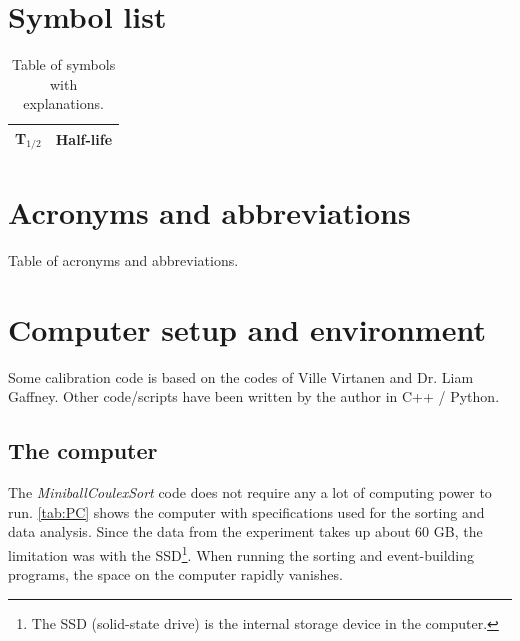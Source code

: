 \documentclass[twoside,english]{uiofysmaster/uiofysmaster}
\begin{document}

\begin{appendices}

\chapter{Symbol list}

\begin{table}[h]
  \centering
  \caption{Table of symbols with explanations.}
    \begin{tabular}{ll}
        \hline
        T$_{1/2}$ & Half-life \\
        \hline
    \end{tabular}
    \label{tab:symbols}
\end{table}


\chapter{Acronyms and abbreviations}

\begin{table}[ht] 
	\centering 
	\caption{Table of acronyms and abbreviations.}
	
\end{table}


\chapter{Computer setup and environment}
Some calibration code is based on the codes of Ville Virtanen and Dr. Liam Gaffney. Other code/scripts have been written by the author in C++ / Python.

\section{The computer}
The \textsl{MiniballCoulexSort} code does not require any a lot of computing power to run. \autoref{tab:PC} shows the computer with specifications used for the sorting and data analysis. Since the data from the experiment takes up about 60 GB, the limitation was with the SSD\footnote{The SSD (solid-state drive) is the internal storage device in the computer.}. When running the sorting and event-building programs, the space on the computer rapidly vanishes. 


\end{appendices}
\end{document}
